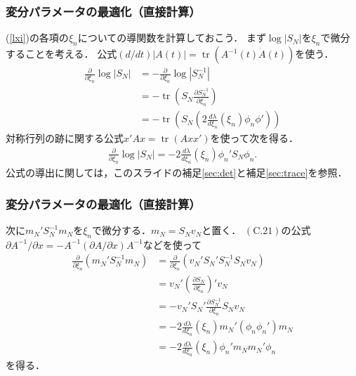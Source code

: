 \documentclass[10pt,usepdftitle=false,hyperref={unicode}]{beamer}
\DeclareMathOperator*{\tr}{tr}
\newcommand{\paref}[1]{{\fontfamily{cmr}\selectfont (\ref{#1})}}
\newcommand{\absolute}[1]{\left|#1\right|}
\newcommand{\parentheses}[1]{\left(#1\right)}
\begin{document}
\begin{frame}
\frametitle{変分パラメータの最適化（直接計算）}
\paref{lxi}の各項の$\xi_n$についての導関数を計算しておこう．
まず$\log \absolute{S_N}$を$\xi_n$で微分することを考える．
公式$\parentheses{d/dt}\absolute{A\parentheses{t}} = \tr \parentheses{A^{-1}\parentheses{t}\dot{A}\parentheses{t}}$を使う．
\begin{align*}
    \frac{\partial}{\partial \xi_n} \log \absolute{S_N}
    &= -\frac{\partial}{\partial \xi_n} \log \absolute{S_N^{-1}} \\
    &= -\tr\parentheses{S_N\frac{\partial S_N^{-1}}{\partial \xi_n}} \\
    &= -\tr\parentheses{S_N\parentheses{2\frac{d\lambda}{d\xi_n}\parentheses{\xi_n}\phi_n\phi'}}
\end{align*}
対称行列の跡に関する公式$x'Ax = \tr \parentheses{Axx'}$を使って次を得る．
\begin{align*}
    \frac{\partial}{\partial \xi_n} \log \absolute{S_N}
    = -2 \frac{d\lambda}{d\xi_n}\parentheses{\xi_n}\phi_n'S_N \phi_n.
\end{align*}
公式の導出に関しては，このスライドの補足\ref{sec:det}と補足\ref{sec:trace}を参照．
\end{frame}

\begin{frame}
\frametitle{変分パラメータの最適化（直接計算）}
次に$m_N'S_N^{-1}m_N$を$\xi_n$で微分する．$m_N = S_Nv_N$と置く．
$(\mathrm{C}.21)$の公式$\partial A^{-1}/\partial x = -A^{-1}(\partial A/\partial x)A^{-1}$などを使って
\begin{align*}
    \frac{\partial}{\partial \xi_n}\parentheses{m_N'S_N^{-1}m_N}
    &= \frac{\partial}{\partial \xi_n}\parentheses{v_N' S_N' S_N^{-1}S_N v_N} \\
    &= v_N'\parentheses{\frac{\partial S_N}{\partial \xi_n}}'v_N \\
    &= - v_N'S_N'\frac{\partial S_N^{-1}}{\partial \xi_n}S_Nv_N \\
    &= - 2\frac{d\lambda}{d\xi_n}\parentheses{\xi_n}m_N'\parentheses{\phi_n\phi_n'}m_N \\
    &= - 2\frac{d\lambda}{d\xi_n}\parentheses{\xi_n}\phi_n'm_Nm_N'\phi_n
\end{align*}
を得る．
\end{frame}
\end{document}

